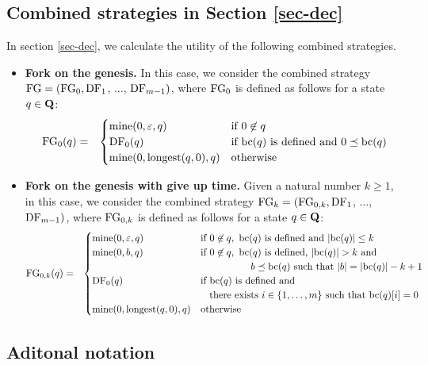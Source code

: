 \subsection{Combined strategies in Section \ref{sec-dec}}
In section \ref{sec-dec}, we calculate the utility of the following combined strategies.
\begin{itemize}
\item {\bf Fork on the genesis.} In this case, we consider the combined strategy $\text{\rm FG} = (\text{\rm FG}_0, \text{\rm DF}_1$, $\ldots$, $\text{\rm DF}_{m-1})$, where $\text{\rm FG}_0$ is defined as follows for a state $q \in \mathbf{Q}$:
\begin{eqnarray*}
\text{\rm FG}_0(q) & = &
\begin{cases}
\text{\rm mine}(0,\varepsilon,q) & \text{if } 0 \not\in q\\
\text{\rm DF}_0(q) & \text{if } \text{bc}(q) \text{ is defined and } 0 \preceq \text{bc}(q)\\
\text{\rm mine}(0,{\text{\rm longest}}(q,0),q) &  \text{otherwise}
\end{cases}
\end{eqnarray*}

\item {\bf Fork on the genesis with give up time.} Given a natural number $k \geq 1$, in this case, we consider the combined strategy $\text{\rm FG}_k = (\text{\rm FG}_{0,k}, \text{\rm DF}_1$, $\ldots$, $\text{\rm DF}_{m-1})$, where $\text{\rm FG}_{0,k}$ is defined as follows for a state $q \in \mathbf{Q}$:
\begin{eqnarray*}
\text{\rm FG}_{0,k}(q) & = &
\begin{cases}
\text{\rm mine}(0,\varepsilon,q) & \text{if } 0 \not\in q,\ \text{bc}(q) \text{ is defined and } |\text{bc}(q)| \leq k\\
\text{\rm mine}(0,b,q) & \text{if } 0 \not\in q,\ \text{bc}(q) \text{ is defined, } |\text{bc}(q)| > k \text{ and }\\
& \hspace{51pt} b \preceq \text{bc}(q) \text{ such that } |b| = |\text{bc}(q)|-k+1\\
\text{\rm DF}_0(q) & \text{if } \text{bc}(q) \text{ is defined and}\\
& \hspace{9pt} \text{there exists } i \in \{1, \ldots, m\} \text{ such that } \text{bc}(q)[i] = 0\\
\text{\rm mine}(0,{\text{\rm longest}}(q,0),q) &  \text{otherwise}
\end{cases}
\end{eqnarray*}

\end{itemize}

\subsection{Aditonal notation}

